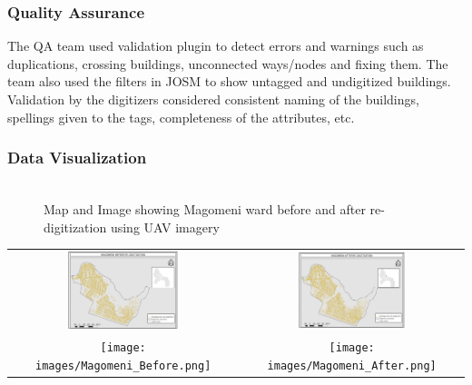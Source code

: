 \documentclass[a4paper,12pt,twoside]{article}
\begin{document}
\subsubsection{Quality Assurance}
The QA team used validation plugin to detect errors and warnings such as duplications, crossing buildings, unconnected ways/nodes and fixing them. The team also used the filters in JOSM to show untagged and undigitized buildings.
Validation by the digitizers considered consistent naming of the buildings, spellings given to the tags, completeness of the attributes, etc.

\subsubsection{Data Visualization}
 \begin{figure}[h]
 	\caption{Map and Image showing Magomeni ward before and after re-digitization using UAV imagery}
 	\centering
 	\includegraphics[width=0\textwidth]{images/Building_Footprint_Digitization.png}
 \end{figure}
\begin{tabular}{|c@{}c|}
  \hline
 
 \includegraphics[width=0.5\textwidth]{images/Magomeni_Before_Redigitization.png}&%
    \includegraphics[width=0.5\textwidth]{images/Magomeni_After_Redigitization.png}\\
 \texttt{[image: images/Magomeni\_Before.png]}&%
    \texttt{[image: images/Magomeni\_After.png]}\\
  \hline
\end{tabular}
\end{document}
